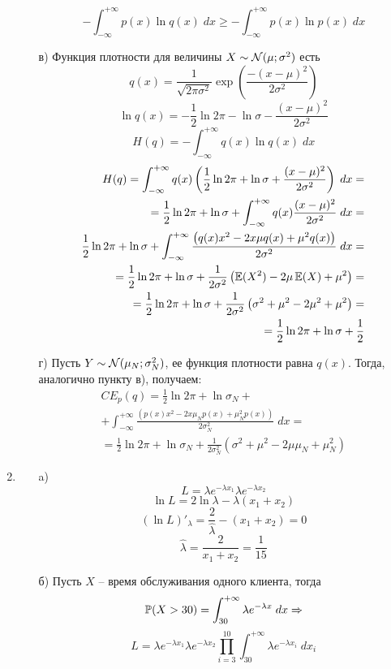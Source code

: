 \begin{enumerate}
\begin{enumerate}
\[-\int^{+\infty}_{-\infty}p(x)\ln q(x) \; dx \geq -\int^{+\infty}_{-\infty}p(x)\ln p(x) \; dx\]
\item[в)] Функция плотности для величины $X \sim \cN(\mu;\sigma^2)$ есть
\[q(x)=\frac{1}{\sqrt{2\pi\sigma^2}}\exp{\left(\frac{-(x-\mu)^2}{2\sigma^2}\right)}\]
\[\ln q(x)=-\frac{1}{2}\ln 2\pi-\ln \sigma-\frac{(x-\mu)^2}{2\sigma^2}\]
\[H(q)=-\int^{+\infty}_{-\infty}q(x)\ln q(x) \; dx\]
\begin{align*}H(q)=\int^{+\infty}_{-\infty}q(x)\left(\frac{1}{2}\ln 2\pi+\ln \sigma+\frac{(x-\mu)^2}{2\sigma^2}\right) \; dx=\\
=\frac{1}{2}\ln 2\pi + \ln \sigma+\int^{+\infty}_{-\infty}q(x)\frac{(x-\mu)^2}{2\sigma^2} \; dx=\\\frac{1}{2}\ln 2\pi + \ln \sigma+\int^{+\infty}_{-\infty}\frac{\left(q(x)x^2-2x\mu q(x)+\mu^2q(x)\right)}{2\sigma^2} \; dx=\\
=\frac{1}{2}\ln 2\pi + \ln \sigma+\frac{1}{2\sigma^2}\left(\E(X^2)-2\mu\E(X)+\mu^2\right)=\\
=\frac{1}{2}\ln 2\pi + \ln \sigma+\frac{1}{2\sigma^2}\left(\sigma^2+\mu^2-2\mu^2+\mu^2\right)=\\=\frac{1}{2}\ln 2\pi + \ln \sigma+\frac{1}{2}\end{align*}
\item[г)] Пусть $Y \sim \cN(\mu_N;\sigma^2_N)$, ее функция плотности равна $q(x)$. Тогда, аналогично пункту в), получаем:
\begin{align*}CE_p(q)=\frac{1}{2}\ln 2\pi + \ln \sigma_N+\\+\int^{+\infty}_{-\infty}\frac{\left(p(x)x^2-2x\mu_N p(x)+\mu^2_Np(x)\right)}{2\sigma^2_N} \; dx=\\
=\frac{1}{2}\ln 2\pi + \ln \sigma_N+\frac{1}{2\sigma^2_N}\left(\sigma^2+\mu^2-2\mu\mu_N+\mu^2_N\right)\end{align*}
\end{enumerate}
\item
\begin{enumerate}
\item[a)] 
\[L=\lambda e^{-\lambda x_1}\lambda e^{-\lambda x_2}\]
\[\ln L=2\ln \lambda-\lambda(x_1+x_2)\]
\[(\ln L)'_\lambda=\frac{2}{\hat{\lambda}}-(x_1+x_2)=0\]
\[\hat{\lambda}=\frac{2}{x_1+x_2}=\frac{1}{15}\]
\item[б)] Пусть $X$ – время обслуживания одного клиента, тогда
\[\P(X>30)=\int^{+\infty}_{30}\lambda e^{-\lambda x} \; dx \Rightarrow\]
\[L=\lambda e^{-\lambda x_1}\lambda e^{-\lambda x_2}\prod^{10}_{i=3}\int^{+\infty}_{30}\lambda e^{-\lambda x_i} \; dx_i\]

\end{enumerate}
\end{enumerate}
